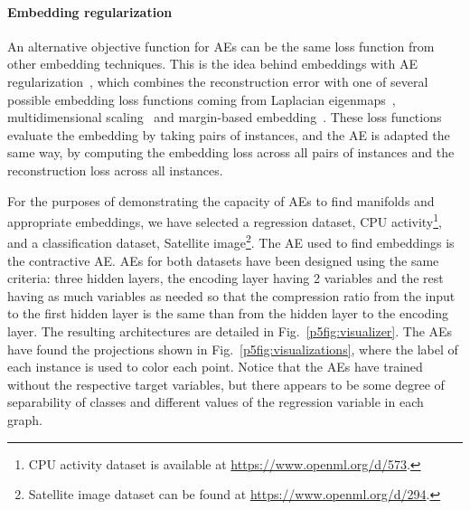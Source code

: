 \paragraph{Embedding regularization} An alternative objective function for AEs can be the same loss function from other embedding techniques. This is the idea behind embeddings with AE regularization~\cite{yu2013embedding}, which combines the reconstruction error with one of several possible embedding loss functions coming from Laplacian eigenmaps~\cite{LaplacianEigenmaps}, multidimensional scaling~\cite{MDS} and margin-based embedding~\cite{hadsell2006dimensionality}. These loss functions evaluate the embedding by taking pairs of instances, and the AE is adapted the same way, by computing the embedding loss across all pairs of instances and the reconstruction loss across all instances.

For the purposes of demonstrating the capacity of AEs to find manifolds and appropriate embeddings, we have selected a regression dataset, CPU activity\footnote{CPU activity dataset is available at \url{https://www.openml.org/d/573}.}, and a classification dataset, Satellite image\footnote{Satellite image dataset can be found at \url{https://www.openml.org/d/294}.}. The AE used to find embeddings is the contractive AE. AEs for both datasets have been designed using the same criteria: three hidden layers, the encoding layer having 2 variables and the rest having as much variables as needed so that the compression ratio from the input to the first hidden layer is the same than from the hidden layer to the encoding layer. The resulting architectures are detailed in Fig.~\ref{p5fig:visualizer}. The AEs have found the projections shown in Fig.~\ref{p5fig:visualizations}, where the label of each instance is used to color each point. Notice that the AEs have trained without the respective target variables, but there appears to be some degree of separability of classes and different values of the regression variable in each graph.

